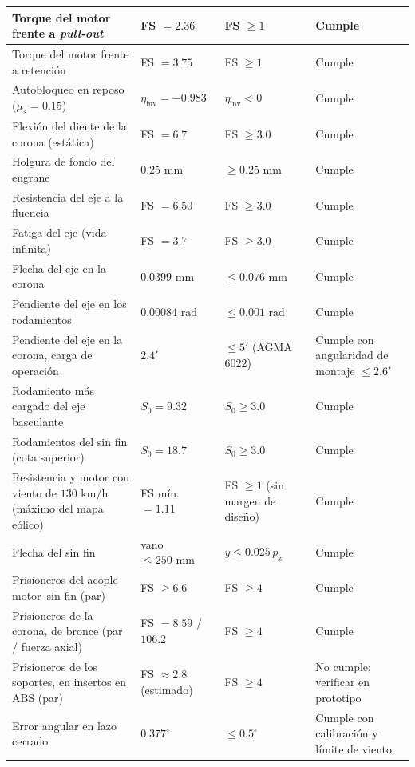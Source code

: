 \documentclass[../../General.tex]{subfiles}
\begin{document}
\begin{center}
\begin{xltabular}{\textwidth}{|X|>{\centering\arraybackslash}p{2.6cm}|>{\centering\arraybackslash}p{2.6cm}|>{\centering\arraybackslash}p{1.8cm}|}
        Torque del motor frente a \textit{pull-out} & FS $= 2.36$ & FS $\geq 1$ & Cumple \\ \hline
        Torque del motor frente a retención & FS $= 3.75$ & FS $\geq 1$ & Cumple \\ \hline
        Autobloqueo en reposo ($\mu_s = 0.15$) & $\eta_{\text{inv}} = -0.983$ & $\eta_{\text{inv}} < 0$ & Cumple \\ \hline
        Flexión del diente de la corona (estática) & FS $= 6.7$ & FS $\geq 3.0$ & Cumple \\ \hline
        Holgura de fondo del engrane & $0.25\text{ mm}$ & $\geq 0.25\text{ mm}$ & Cumple \\ \hline
        Resistencia del eje a la fluencia & FS $= 6.50$ & FS $\geq 3.0$ & Cumple \\ \hline
        Fatiga del eje (vida infinita) & FS $= 3.7$ & FS $\geq 3.0$ & Cumple \\ \hline
        Flecha del eje en la corona & $0.0399\text{ mm}$ & $\leq 0.076\text{ mm}$ & Cumple \\ \hline
        Pendiente del eje en los rodamientos & $0.00084\text{ rad}$ & $\leq 0.001\text{ rad}$ & Cumple \\ \hline
        Pendiente del eje en la corona, carga de operación & $2.4'$ & $\leq 5'$ (AGMA 6022) & Cumple con angularidad de montaje $\leq 2.6'$ \\ \hline
        Rodamiento más cargado del eje basculante & $S_0 = 9.32$ & $S_0 \geq 3.0$ & Cumple \\ \hline
        Rodamientos del sin fin (cota superior) & $S_0 = 18.7$ & $S_0 \geq 3.0$ & Cumple \\ \hline
        Resistencia y motor con viento de $130\text{ km/h}$ (máximo del mapa eólico) & FS mín. $= 1.11$ & FS $\geq 1$ (sin margen de diseño) & Cumple \\ \hline
        Flecha del sin fin & vano $\leq 250\text{ mm}$ & $y \leq 0.025\,p_x$ & Cumple \\ \hline
        Prisioneros del acople motor--sin fin (par) & FS $\geq 6.6$ & FS $\geq 4$ & Cumple \\ \hline
        Prisioneros de la corona, de bronce (par / fuerza axial) & FS $= 8.59$ / $106.2$ & FS $\geq 4$ & Cumple \\ \hline
        Prisioneros de los soportes, en insertos en ABS (par) & FS $\approx 2.8$ (estimado) & FS $\geq 4$ & No cumple; verificar en prototipo \\ \hline
        Error angular en lazo cerrado & $0.377^\circ$ & $\leq 0.5^\circ$ & Cumple con calibración y límite de viento \\ \hline
    \end{xltabular}
\end{center}
\end{document}
